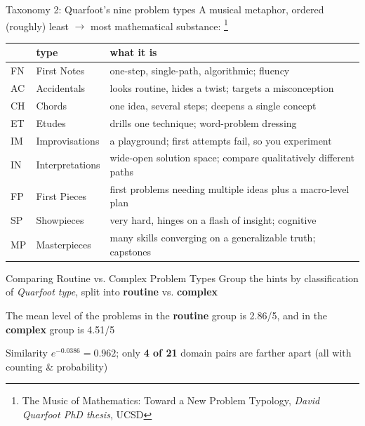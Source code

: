 \documentclass[10pt,aspectratio=169]{beamer}
\begin{document}
\begin{frame}{Taxonomy 2: Quarfoot's nine problem types}
  A musical metaphor, ordered (roughly) least $\to$ most mathematical substance: \footnote{The Music of Mathematics: Toward a New Problem Typology, \textit{David Quarfoot PhD thesis}, UCSD} \pause 
  \medskip
  \begin{center}
    \small
    \begin{tabular}{llp{}}
      \toprule
      & type & what it is \\
      \midrule
      FN & First Notes & one-step, single-path, algorithmic; fluency \\ \pause 
      AC & Accidentals & looks routine, hides a twist; targets a misconception \\ \pause 
      CH & Chords & one idea, several steps; deepens a single concept \\ \pause 
      ET & Etudes & drills one technique; word-problem dressing \\ \pause 
      IM & Improvisations & a playground; first attempts fail, so you experiment \\ \pause 
      IN & Interpretations & wide-open solution space; compare qualitatively different paths \\ \pause 
      FP & First Pieces & first problems needing multiple ideas plus a macro-level plan \\ \pause 
      SP & Showpieces & very hard, hinges on a flash of insight; cognitive \\ \pause 
      MP & Masterpieces & many skills converging on a generalizable truth; capstones \\
      \bottomrule
    \end{tabular}
  \end{center}
\end{frame}

\begin{frame}{Comparing Routine vs. Complex Problem Types}
  Group the hints by classification of \emph{Quarfoot type}, split into \textbf{routine} vs. \textbf{complex} \pause 

  \bigskip 

  The mean level of the problems in the \textbf{routine} group is 2.86/5, and in the \textbf{complex} group is 4.51/5

  \bigskip \pause 
  Similarity $e^{-0.0386} = \mathbf{0.962}$; only \textbf{4 of 21} domain pairs
  are farther apart (all with counting \& probability)
\end{frame}
\end{document}
